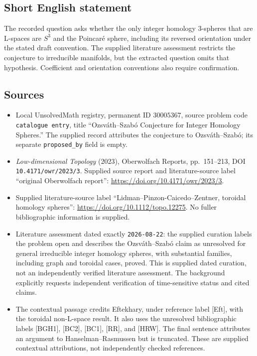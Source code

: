 \documentclass[11pt]{article}
\begin{document}
\subsection{Short English statement}
The recorded question asks whether the only integer homology \(3\)-spheres that are L-spaces are \(S^3\) and the Poincar\'e sphere, including its reversed orientation under the stated draft convention. The supplied literature assessment restricts the conjecture to irreducible manifolds, but the extracted question omits that hypothesis. Coefficient and orientation conventions also require confirmation.
\subsection{Sources}
\begin{itemize}
\item Local UnsolvedMath registry, permanent ID \(30005367\), source problem code \texttt{catalogue entry}, title ``Ozsv\'ath--Szab\'o Conjecture for Integer Homology Spheres.'' The supplied record attributes the conjecture to Ozsv\'ath--Szab\'o; its separate \texttt{proposed\_by} field is empty.
\item \emph{Low-dimensional Topology} (2023), Oberwolfach Reports, pp.~151--213, DOI \texttt{10.4171/owr/2023/3}. Supplied source report and literature-source label ``original Oberwolfach report'': \url{https://doi.org/10.4171/owr/2023/3}.
\item Supplied literature-source label ``Lidman--Pinzon-Caicedo--Zentner, toroidal homology spheres'': \url{https://doi.org/10.1112/topo.12275}. No fuller bibliographic information is supplied.
\item Literature assessment dated exactly \texttt{2026-08-22}: the supplied curation labels the problem open and describes the Ozsv\'ath--Szab\'o claim as unresolved for general irreducible integer homology spheres, with substantial families, including graph and toroidal cases, proved. This is supplied dated curation, not an independently verified literature assessment. The background explicitly requests independent verification of time-sensitive status and cited claims.
\item The contextual passage credits Eftekhary, under reference label [Eft], with the toroidal non-L-space result. It also uses the unresolved bibliographic labels [BGH1], [BC2], [BC1], [RR], and [HRW]. The final sentence attributes an argument to Hanselman--Rasmussen but is truncated. These are supplied contextual attributions, not independently checked references.
\end{itemize}
\end{document}
